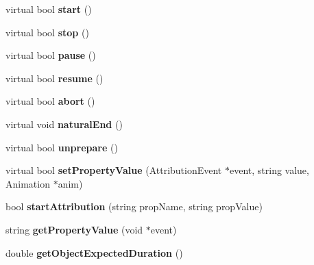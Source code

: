 \begin{CompactItemize}
\item 
virtual bool \textbf{start} ()\label{classbr_1_1pucrio_1_1telemidia_1_1ginga_1_1ncl_1_1adapters_1_1FormatterPlayerAdapter_2a1dbe283ac44900c920f3f79339f9f6}

\item 
virtual bool \textbf{stop} ()\label{classbr_1_1pucrio_1_1telemidia_1_1ginga_1_1ncl_1_1adapters_1_1FormatterPlayerAdapter_3d0f1501fa4ccfb9e3f868ab4a185856}

\item 
virtual bool \textbf{pause} ()\label{classbr_1_1pucrio_1_1telemidia_1_1ginga_1_1ncl_1_1adapters_1_1FormatterPlayerAdapter_1bb2a8fd099734a2a6d1cab9fbca1939}

\item 
virtual bool \textbf{resume} ()\label{classbr_1_1pucrio_1_1telemidia_1_1ginga_1_1ncl_1_1adapters_1_1FormatterPlayerAdapter_0c7b890cc1963471052f4d51db565f8a}

\item 
virtual bool \textbf{abort} ()\label{classbr_1_1pucrio_1_1telemidia_1_1ginga_1_1ncl_1_1adapters_1_1FormatterPlayerAdapter_fd9013d2c3c1e4507a6ba5bb5cdac9f6}

\item 
virtual void \textbf{naturalEnd} ()\label{classbr_1_1pucrio_1_1telemidia_1_1ginga_1_1ncl_1_1adapters_1_1FormatterPlayerAdapter_0e08b713f0740e1881952f0cc8c307fe}

\item 
virtual bool \textbf{unprepare} ()\label{classbr_1_1pucrio_1_1telemidia_1_1ginga_1_1ncl_1_1adapters_1_1FormatterPlayerAdapter_e7bf99c1347e02aa34a54ed2e1d00865}

\item 
virtual bool \textbf{setPropertyValue} (AttributionEvent $\ast$event, string value, Animation $\ast$anim)\label{classbr_1_1pucrio_1_1telemidia_1_1ginga_1_1ncl_1_1adapters_1_1FormatterPlayerAdapter_5d79a10e2dd630bdc4d9c4823ea59287}

\item 
bool \textbf{startAttribution} (string propName, string propValue)\label{classbr_1_1pucrio_1_1telemidia_1_1ginga_1_1ncl_1_1adapters_1_1FormatterPlayerAdapter_4ea6675e634e79295a59967617520795}

\item 
string \textbf{getPropertyValue} (void $\ast$event)\label{classbr_1_1pucrio_1_1telemidia_1_1ginga_1_1ncl_1_1adapters_1_1FormatterPlayerAdapter_2b496e7b8651cec0368e11b9f3a8e699}

\item 
double \textbf{getObjectExpectedDuration} ()\label{classbr_1_1pucrio_1_1telemidia_1_1ginga_1_1ncl_1_1adapters_1_1FormatterPlayerAdapter_22a91adf5f8785861e3178ef718bf6bc}


\end{CompactItemize}

